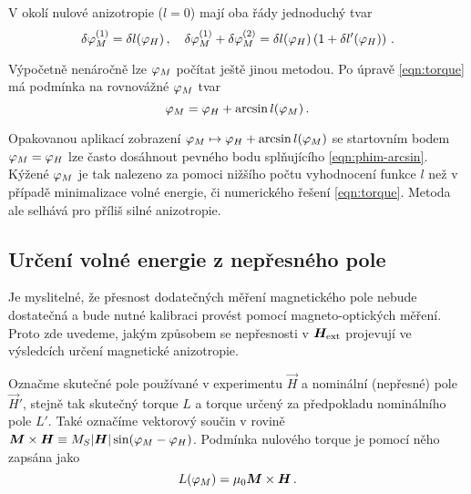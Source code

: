 V okolí nulové anizotropie ($l=0$) mají oba řády jednoduchý tvar
\begin{equation}
    \delta\varphi_M^{(1)} = \delta l(\varphi_H) \,,\quad \delta\varphi_M^{(1)}+\delta\varphi_M^{(2)} = \delta l(\varphi_H)\left( 1+\delta l'(\varphi_H) \right) \,.
\end{equation}

Výpočetně nenáročně lze $\varphi_M$ počítat ještě jinou metodou.
Po úpravě \eqref{eqn:torque} má podmínka na rovnovážné $\varphi_M$ tvar
\begin{equation}
    \label{eqn:phim-arcsin}
    \varphi_M = \varphi_H + \arcsin{l(\varphi_M)} \,.
\end{equation}

Opakovanou aplikací zobrazení $\varphi_M \mapsto \varphi_H + \arcsin{l(\varphi_M)}$ se startovním bodem $\varphi_M = \varphi_H$ lze často dosáhnout pevného bodu splňujícího \eqref{eqn:phim-arcsin}.
Kýžené $\varphi_M$ je tak nalezeno za pomoci nižšího počtu vyhodnocení funkce $l$ než v případě minimalizace volné energie, či numerického řešení \eqref{eqn:torque}.
Metoda ale selhává pro příliš silné anizotropie.

\subsection*{Určení volné energie z nepřesného pole}

Je myslitelné, že přesnost dodatečných měření magnetického pole nebude dostatečná a bude nutné kalibraci provést pomocí magneto-optických měření.
Proto zde uvedeme, jakým způsobem se nepřesnosti v $\bm{H}_\textrm{ext}$ projevují ve výsledcích určení magnetické anizotropie.

Označme skutečné pole používané v experimentu $\vec{H}$ a nominální (nepřesné) pole $\vec{H}'$, stejně tak skutečný torque $L$ a torque určený za předpokladu nominálního pole $L'$.
Také označíme vektorový součin v rovině $\bm{M}\times\bm{H}\equiv M_S |\bm{H}|\sin(\varphi_M-\varphi_H)$.
Podmínka nulového torque je pomocí něho zapsána jako 
\begin{equation}
    \label{eqn:torque-soucin}
    L(\varphi_M) = \mu_0 \bm{M} \times \bm{H} \,.
\end{equation}


